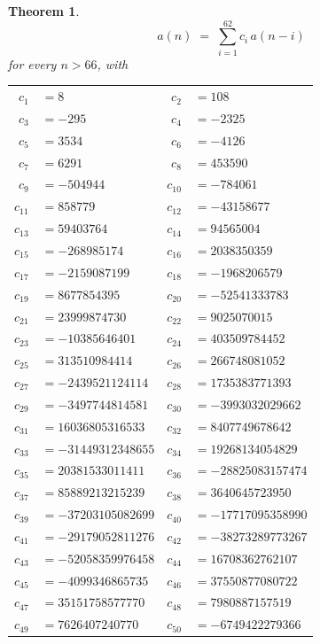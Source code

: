 \documentclass[11pt,a4paper]{article}
\theoremstyle{plain}
\newtheorem{theorem}{Theorem}
\theoremstyle{definition}
\begin{document}
\begin{theorem}
\[
a(n)\;=\;\sum_{i=1}^{62}c_i\,a(n-i)
\]
for every $n>66$, with
\begin{center}\footnotesize
\begin{tabular}{r@{\,}l@{\qquad}r@{\,}l}
$c_{1}$ & $=8$ & $c_{2}$ & $=108$ \\
$c_{3}$ & $=-295$ & $c_{4}$ & $=-2325$ \\
$c_{5}$ & $=3534$ & $c_{6}$ & $=-4126$ \\
$c_{7}$ & $=6291$ & $c_{8}$ & $=453590$ \\
$c_{9}$ & $=-504944$ & $c_{10}$ & $=-784061$ \\
$c_{11}$ & $=858779$ & $c_{12}$ & $=-43158677$ \\
$c_{13}$ & $=59403764$ & $c_{14}$ & $=94565004$ \\
$c_{15}$ & $=-268985174$ & $c_{16}$ & $=2038350359$ \\
$c_{17}$ & $=-2159087199$ & $c_{18}$ & $=-1968206579$ \\
$c_{19}$ & $=8677854395$ & $c_{20}$ & $=-52541333783$ \\
$c_{21}$ & $=23999874730$ & $c_{22}$ & $=9025070015$ \\
$c_{23}$ & $=-10385646401$ & $c_{24}$ & $=403509784452$ \\
$c_{25}$ & $=313510984414$ & $c_{26}$ & $=266748081052$ \\
$c_{27}$ & $=-2439521124114$ & $c_{28}$ & $=1735383771393$ \\
$c_{29}$ & $=-3497744814581$ & $c_{30}$ & $=-3993032029662$ \\
$c_{31}$ & $=16036805316533$ & $c_{32}$ & $=8407749678642$ \\
$c_{33}$ & $=-31449312348655$ & $c_{34}$ & $=19268134054829$ \\
$c_{35}$ & $=20381533011411$ & $c_{36}$ & $=-28825083157474$ \\
$c_{37}$ & $=85889213215239$ & $c_{38}$ & $=3640645723950$ \\
$c_{39}$ & $=-37203105082699$ & $c_{40}$ & $=-17717095358990$ \\
$c_{41}$ & $=-29179052811276$ & $c_{42}$ & $=-38273289773267$ \\
$c_{43}$ & $=-52058359976458$ & $c_{44}$ & $=16708362762107$ \\
$c_{45}$ & $=-4099346865735$ & $c_{46}$ & $=37550877080722$ \\
$c_{47}$ & $=35151758577770$ & $c_{48}$ & $=7980887157519$ \\
$c_{49}$ & $=7626407240770$ & $c_{50}$ & $=-6749422279366$ \\

\end{tabular}
\end{center}
\end{theorem}
\end{document}
